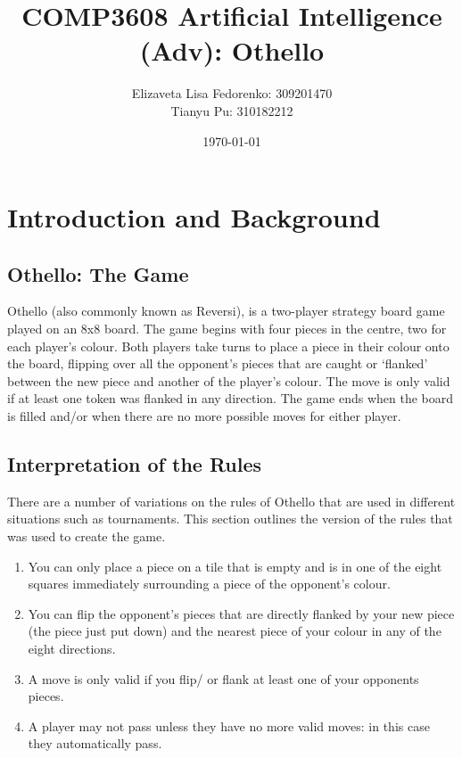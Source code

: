 \documentclass[12pt]{article}
\title{COMP3608 Artificial Intelligence (Adv): Othello}
\author{Elizaveta Lisa Fedorenko: 309201470
\\ Tianyu Pu: 310182212}
\date{\today}
\begin{document}
\maketitle

\begin{abstract}
\end{abstract}

\section{Introduction and Background}
\subsection{Othello: The Game}
Othello (also commonly known as Reversi), is a two-player strategy board game played on an 8x8 board.
The game begins with four pieces in the centre, two for each player's colour. Both players take turns
to place a piece in their colour onto the board, flipping over all the opponent's pieces that are caught
or `flanked' between the new piece and another of the player's colour. The move is only valid if at
least one token was flanked in any direction. The game ends when the board is filled and/or when there are
no more possible moves for either player.

\subsection{Interpretation of the Rules}
There are a number of variations on the rules of Othello that are used in different situations such as
tournaments. This section outlines the version of the rules that was used to create the game.
\begin{enumerate}
 \item You can only place a piece on a tile that is empty and is in one of the eight squares immediately
 surrounding a piece of the opponent's colour.
 \item You can flip the opponent's pieces that are directly flanked by your new piece (the piece just
 put down) and the nearest piece of your colour in any of the eight directions.
 \item A move is only valid if you flip/ or flank at least one of your opponents pieces.
 \item A player may not pass unless they have no more valid moves: in this case they automatically pass.
\end{enumerate}
\end{document}
